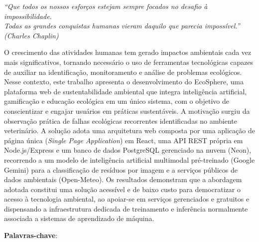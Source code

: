 \documentclass[
	12pt,
	openright,
	oneside,
	a4paper,
	chapter=TITLE,
	section=TITLE,
	subsection=TITLE,
	subsubsection=TITLE,
	english,
	brazil
	]{abntex2}
\begin{document}
\begin{epigrafe}
    \vspace*{\fill}
	\begin{flushright}
		\textit{``Que todos os nossos esforços estejam sempre focados no desafio à impossibilidade.\\ Todas as grandes conquistas humanas vieram daquilo que parecia impossível.''\\
		(Charles Chaplin)}
	\end{flushright}
\end{epigrafe}

\setlength{\absparsep}{18pt}
\begin{resumo}

O crescimento das atividades humanas tem gerado impactos ambientais cada vez mais significativos, tornando necessário o uso de ferramentas tecnológicas capazes de auxiliar na identificação, monitoramento e análise de problemas ecológicos. Nesse contexto, este trabalho apresenta o desenvolvimento do EcoSphere, uma plataforma web de sustentabilidade ambiental que integra inteligência artificial, gamificação e educação ecológica em um único sistema, com o objetivo de conscientizar e engajar usuários em práticas sustentáveis. A motivação surgiu da observação prática de falhas ecológicas recorrentes identificadas no ambiente veterinário. A solução adota uma arquitetura web composta por uma aplicação de página única (\textit{Single Page Application}) em React, uma API REST própria em Node.js/Express e um banco de dados PostgreSQL gerenciado na nuvem (Neon), recorrendo a um modelo de inteligência artificial multimodal pré-treinado (Google Gemini) para a classificação de resíduos por imagem e a serviços públicos de dados ambientais (Open-Meteo). Os resultados demonstram que a abordagem adotada constitui uma solução acessível e de baixo custo para democratizar o acesso à tecnologia ambiental, ao apoiar-se em serviços gerenciados e gratuitos e dispensando a infraestrutura dedicada de treinamento e inferência normalmente associada a sistemas de aprendizado de máquina.

\textbf{Palavras-chave}: \imprimirpalavraschave

\end{resumo}
\end{document}
